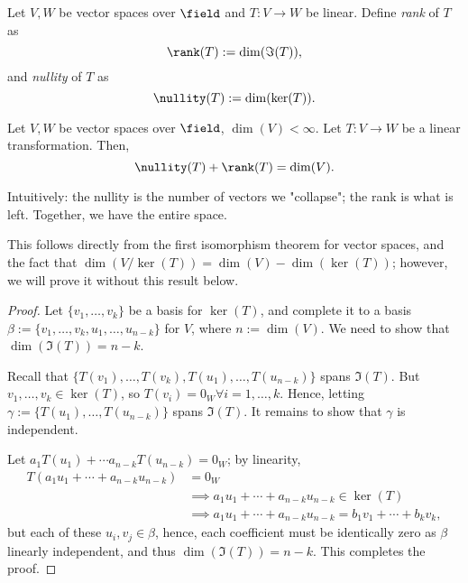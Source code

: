 \begin{definition}
    Let $V, W$ be vector spaces over $\field$ and $T: V \to W$ be linear. Define \emph{rank} of $T$ as \[
    \rank(T) := \dim (\Im(T)),
    \]
    and \emph{nullity} of $T$ as \[
    \nullity(T) := \dim(\ker(T)).    
    \]
\end{definition}

\begin{theorem}\label{thm:ranknullity}
    Let $V, W$ be vector spaces over $\field$, $\dim (V) < \infty$. Let $T: V \to W$ be a linear transformation. Then, \[
        \nullity(T) + \rank(T) = \dim(V).    
    \]
\end{theorem}

\begin{remark}
    Intuitively: the nullity is the number of vectors we "collapse"; the rank is what is left. Together, we have the entire space.
\end{remark}

\begin{remark}
    This follows directly from the first isomorphism theorem for vector spaces, and the fact that $\dim(V / \ker (T)) = \dim (V) - \dim (\ker (T))$; however, we will prove it without this result below.
\end{remark}

\begin{proof}
        Let $\{v_1, \dots, v_k\}$ be a basis for $\ker (T)$, and complete it to a basis $\beta := \{v_1, \dots, v_k, u_1, \dots, u_{n-k}\}$ for $V$,  where $n := \dim (V)$. We need to show that $\dim(\Im(T)) = n-k$.

        Recall that $\{T(v_1), \dots, T(v_k), T(u_1), \dots, T(u_{n-k})\}$ spans $\Im(T)$. But $v_1, \dots, v_k \in \ker (T)$, so $T(v_i) = 0_W \forall i = 1, \dots, k$. Hence, letting $\gamma := \{T(u_1), \dots, T(u_{n-k})\}$ spans $\Im(T)$. It remains to show that $\gamma$ is independent.

        Let $a_1 T(u_1) + \cdots a_{n-k} T(u_{n-k}) = 0_W$; by linearity, \begin{align*}
            T(a_1 u_1 + \cdots+ a_{n-k} u_{n-k}) &= 0_W\\
            &\implies a_1 u_1 +\cdots  + a_{n-k} u_{n-k} \in \ker (T)\\
            &\implies a_1 u_1 + \cdots + a_{n-k}u_{n-k} = b_1 v_1 + \cdots + b_k v_k,
        \end{align*}
        but each of these $u_i, v_j \in \beta$, hence, each coefficient must be identically zero as $\beta$ linearly independent, and thus $\dim (\Im(T)) = n -k$. This completes the proof.
\end{proof}

